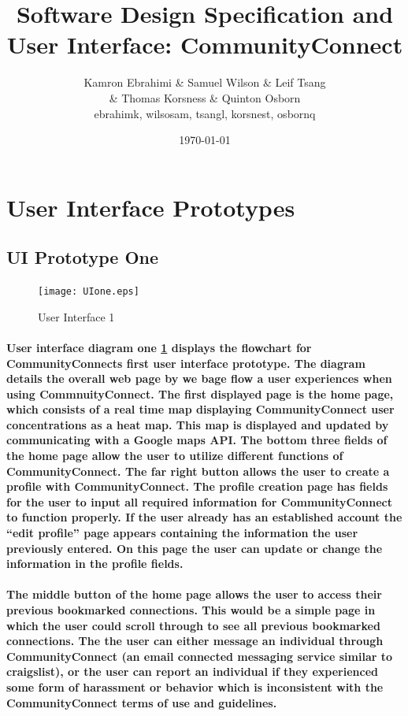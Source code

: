 \documentclass[12pt]{article}
\title{Software Design Specification and User Interface: CommunityConnect}
\author{Kamron Ebrahimi \& Samuel Wilson \& Leif Tsang \\ \& Thomas Korsness  \& Quinton Osborn \\ ebrahimk, wilsosam, tsangl, korsnest, osbornq}
\date{\today}
\begin{document}
\maketitle

\tableofcontents

\newpage
\section{\bf User Interface Prototypes}
  \subsection{\bf UI Prototype One}

        \begin{figure}[H]
                \texttt{[image: UIone.eps]}
                \caption{User Interface 1}
                \label{fig: User Interface 1}
        \end{figure}

  \paragraph{\normalfont \indent User interface diagram one \ref{fig: User Interface 1} displays the flowchart for CommunityConnects first user interface prototype. The diagram details the overall web page by we bage flow a user experiences when using CommnuityConnect. The first displayed page is the home page, which consists of a real time map displaying CommunityConnect user concentrations as a heat map. This map is displayed and updated by communicating with a Google maps API. The bottom three fields of the home page allow the user to utilize different functions of CommunityConnect. The far right button allows the user to create a profile with CommunityConnect. The profile creation page has fields for the user to input all required information for CommunityConnect to function properly. If the user already has an established account the “edit profile” page appears containing the information the user previously entered. On this page the user can update or change the information in the profile fields.
  }
  \paragraph{\normalfont \indent The middle button of the home page allows the user to access their previous bookmarked connections. This would be a simple page in which the user could scroll through to see all previous bookmarked connections. The the user can either message an individual through CommunityConnect (an email connected messaging service similar to craigslist), or the user can report an individual if they experienced some form of harassment or behavior which is inconsistent with the CommunityConnect terms of use and guidelines.
  }
\end{document}
